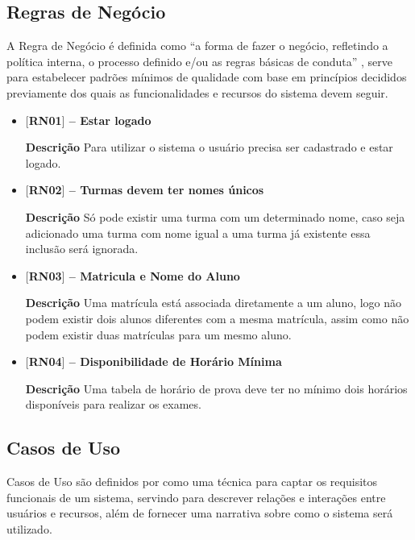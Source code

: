 \subsection{Regras de Negócio}


A Regra de Negócio é definida como “a forma de fazer o negócio, refletindo a política interna, o processo definido e/ou as regras básicas de conduta” \cite{dextra2013}, serve para estabelecer padrões mínimos de qualidade com base em princípios decididos previamente dos quais as funcionalidades e recursos do sistema devem seguir.


\begin{itemize}
    \item[] \textbf{$[$RN01$]$ -- Estar logado}
    
    \textbf{Descrição} 
    Para utilizar o sistema o usuário precisa ser cadastrado e estar logado.
    
    \item[] \textbf{$[$RN02$]$ -- Turmas devem ter nomes únicos}
    
    \textbf{Descrição}
    Só pode existir uma turma com um determinado nome, caso seja adicionado uma turma com nome igual a uma turma já existente essa inclusão será ignorada. 
    
    \item[] \textbf{$[$RN03$]$ -- Matricula e Nome do Aluno}
    
    \textbf{Descrição}
    Uma matrícula está associada diretamente a um aluno, logo não podem existir dois alunos diferentes com a mesma matrícula, assim como não podem existir duas matrículas para um mesmo aluno.
    
    \item[] \textbf{$[$RN04$]$ -- Disponibilidade de Horário Mínima}
    
    \textbf{Descrição}
    Uma tabela de horário de prova deve ter  no mínimo dois horários disponíveis para realizar os exames.
    
\end{itemize}

\subsection{Casos de Uso}
 
 Casos de Uso são definidos por  como uma técnica para captar os requisitos funcionais de um sistema, servindo para descrever relações e interações entre usuários e recursos, além de fornecer uma narrativa sobre como o sistema será utilizado.
 
